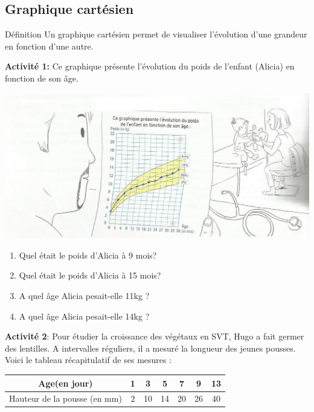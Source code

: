 \documentclass[12pt,a4paper]{article}
\begin{document}
\subsection{Graphique cartésien}

\begin{definition}{Définition}
Un graphique cartésien permet de visualiser l’évolution d’une grandeur en fonction d’une autre.
\end{definition}

\newpage

\textbf{Activité 1:} Ce graphique présente l’évolution du poids de l’enfant (Alicia) en fonction de son âge.

\includegraphics[scale=1]{img/act-1.png} 

\begin{enumerate}
\item Quel était le poids d'Alicia à 9 mois? 
\item Quel était le poids d'Alicia à 15 mois? 
\item A quel âge Alicia pesait-elle 11kg ? 
\item A quel âge Alicia pesait-elle 14kg ? 
\end{enumerate}

\textbf{Activité 2}: Pour étudier la croissance des végétaux en SVT, Hugo a fait germer des lentilles. A intervalles réguliers, il a mesuré la longueur des jeunes pousses. Voici le tableau récapitulatif de ses mesures :\\

\begin{center}
\begin{tabular}{|c|c|c|c|c|c|c|}
\hline
Age(en jour)                 & 1 & 3  & 5  & 7  & 9  & 13   \\ \hline
Hauteur de la pousse (en mm) & 2 & 10 & 14 & 20 & 26 & 40   \\ \hline
\end{tabular}
\end{center}
\end{document}
